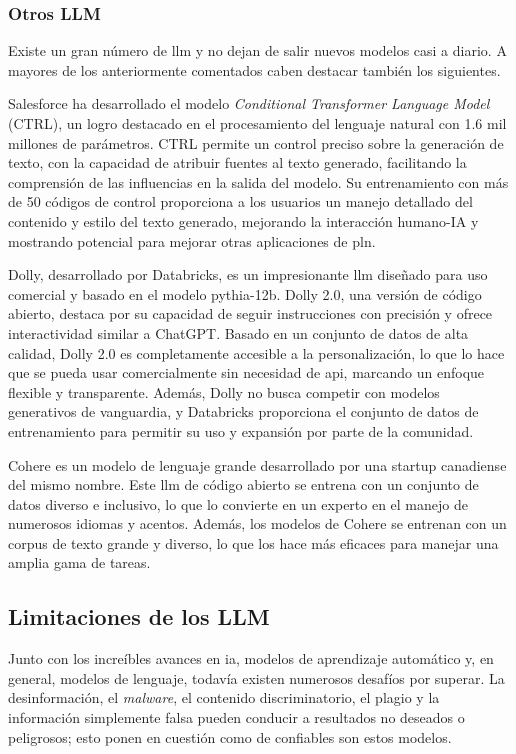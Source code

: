 \subsubsection{Otros LLM}

Existe un gran número de \acrshort{llm} y no dejan de salir nuevos modelos casi a diario. A mayores de los anteriormente comentados caben destacar también los siguientes.

Salesforce ha desarrollado el modelo \textit{Conditional Transformer Language Model} (CTRL), un logro destacado en el procesamiento del lenguaje natural con 1.6 mil millones de parámetros. CTRL permite un control preciso sobre la generación de texto, con la capacidad de atribuir fuentes al texto generado, facilitando la comprensión de las influencias en la salida del modelo. Su entrenamiento con más de 50 códigos de control proporciona a los usuarios un manejo detallado del contenido y estilo del texto generado, mejorando la interacción humano-IA y mostrando potencial para mejorar otras aplicaciones de \acrlong{pln}.

Dolly, desarrollado por Databricks, es un impresionante \acrfull{llm} diseñado para uso comercial y basado en el modelo pythia-12b. Dolly 2.0, una versión de código abierto, destaca por su capacidad de seguir instrucciones con precisión y ofrece interactividad similar a ChatGPT. Basado en un conjunto de datos de alta calidad, Dolly 2.0 es completamente accesible a la personalización, lo que lo hace que se pueda usar comercialmente sin necesidad de \acrshort{api}, marcando un enfoque flexible y transparente. Además, Dolly no busca competir con modelos generativos de vanguardia, y Databricks proporciona el conjunto de datos de entrenamiento para permitir su uso y expansión por parte de la comunidad.

Cohere es un modelo de lenguaje grande desarrollado por una startup canadiense del mismo nombre. Este \acrshort{llm}  de código abierto se entrena con un conjunto de datos diverso e inclusivo, lo que lo convierte en un experto en el manejo de numerosos idiomas y acentos. Además, los modelos de Cohere se entrenan con un corpus de texto grande y diverso, lo que los hace más eficaces para manejar una amplia gama de tareas.

\subsection{Limitaciones de los LLM}

Junto con los increíbles avances en \acrlong{ia}, modelos de aprendizaje automático y, en general, modelos de lenguaje, todavía existen numerosos desafíos por superar. La desinformación, el \textit{malware}, el contenido discriminatorio, el plagio y la información simplemente falsa pueden conducir a resultados no deseados o peligrosos; esto ponen en cuestión como de confiables son estos modelos.


